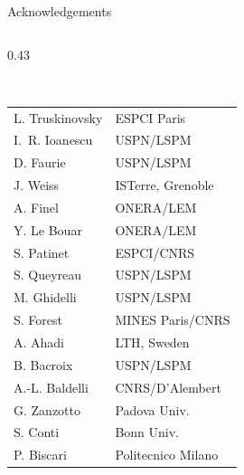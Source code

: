 \documentclass[10pt, aspectratio=169]{beamer}
\begin{document}
\begin{frame}{Acknowledgements}
    \vspace{-0.1cm}
    \begin{columns}[t, onlytextwidth]

        \begin{column}{0.43\textwidth}
            \\[0.06cm]
            {\scriptsize
            \begin{tabular}{@{}l@{\hspace{6pt}}l@{}}
                L. Truskinovsky  & {\color{gray}ESPCI Paris}        \\[1pt]
                I.~R. Ioanescu   & {\color{gray}USPN/LSPM}          \\[1pt]
                D. Faurie        & {\color{gray}USPN/LSPM}          \\[1pt]
                J. Weiss         & {\color{gray}ISTerre, Grenoble}  \\[1pt]
                A. Finel         & {\color{gray}ONERA/LEM}          \\[1pt]
                Y. Le Bouar      & {\color{gray}ONERA/LEM}          \\[1pt]
                S. Patinet       & {\color{gray}ESPCI/CNRS}         \\[1pt]
                S. Queyreau      & {\color{gray}USPN/LSPM}          \\[1pt]
                M. Ghidelli      & {\color{gray}USPN/LSPM}          \\[1pt]
                S. Forest        & {\color{gray}MINES Paris/CNRS}   \\[1pt]
                A. Ahadi         & {\color{gray}LTH, Sweden}        \\[1pt]
                B. Bacroix       & {\color{gray}USPN/LSPM}          \\[1pt]
                A.-L. Baldelli   & {\color{gray}CNRS/D'Alembert}     \\[1pt]
                G. Zanzotto      & {\color{gray}Padova Univ.}        \\[1pt]
                S. Conti         & {\color{gray}Bonn Univ.}          \\[1pt]
                P. Biscari       & {\color{gray}Politecnico Milano}   \\
            \end{tabular}
            }
        \end{column}


\end{columns}
\end{frame}
\end{document}
